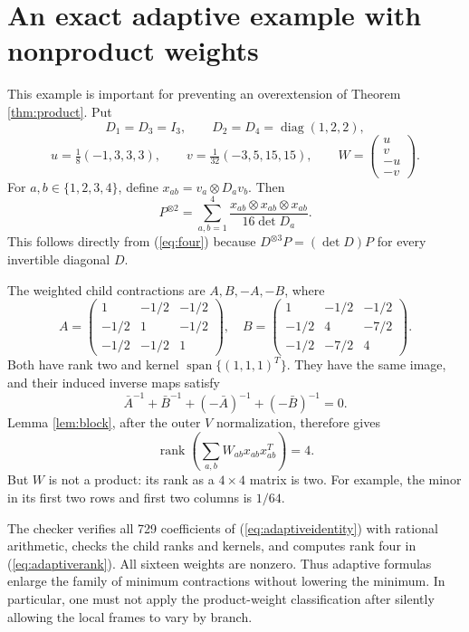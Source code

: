 \documentclass[11pt,letterpaper]{article}
\theoremstyle{definition}\newtheorem{definition}[theorem]{Definition}
\theoremstyle{remark}\newtheorem{remark}[theorem]{Remark}
\DeclareMathOperator{\rank}{rank}
\DeclareMathOperator{\diag}{diag}
\DeclareMathOperator{\spanop}{span}
\begin{document}
\section{An exact adaptive example with nonproduct weights}\label{sec:example}
This example is important for preventing an overextension of Theorem \ref{thm:product}. Put
\[
D_1=D_3=I_3,\qquad D_2=D_4=\diag(1,2,2),
\]
\[
u=\tfrac18(-1,3,3,3),\qquad v=\tfrac1{32}(-3,5,15,15),\qquad
W=\begin{pmatrix}u\\v\\-u\\-v\end{pmatrix}.
\]
For $a,b\in\{1,2,3,4\}$, define $x_{ab}=v_a\otimes D_av_b$. Then
\begin{equation}\label{eq:adaptiveidentity}
P^{\otimes2}=\sum_{a,b=1}^{4}\frac{x_{ab}\otimes x_{ab}\otimes x_{ab}}{16\det D_a}.
\end{equation}
This follows directly from (\ref{eq:four}) because $D^{\otimes3}P=(\det D)P$ for every invertible diagonal $D$.

The weighted child contractions are $A,B,-A,-B$, where
\[
A=\begin{pmatrix}1&-1/2&-1/2\\-1/2&1&-1/2\\-1/2&-1/2&1\end{pmatrix},\quad
B=\begin{pmatrix}1&-1/2&-1/2\\-1/2&4&-7/2\\-1/2&-7/2&4\end{pmatrix}.
\]
Both have rank two and kernel $\spanop\{(1,1,1)^T\}$. They have the same image, and their induced inverse maps satisfy
\[
\bar A^{-1}+\bar B^{-1}+(-\bar A)^{-1}+(-\bar B)^{-1}=0.
\]
Lemma \ref{lem:block}, after the outer $V$ normalization, therefore gives
\begin{equation}\label{eq:adaptiverank}
\rank\left(\sum_{a,b}W_{ab}x_{ab}x_{ab}^{T}\right)=4.
\end{equation}
But $W$ is not a product: its rank as a $4\times4$ matrix is two. For example, the minor in its first two rows and first two columns is $1/64$.

The checker verifies all 729 coefficients of (\ref{eq:adaptiveidentity}) with rational arithmetic, checks the child ranks and kernels, and computes rank four in (\ref{eq:adaptiverank}). All sixteen weights are nonzero. Thus adaptive formulas enlarge the family of minimum contractions without lowering the minimum. In particular, one must not apply the product-weight classification after silently allowing the local frames to vary by branch.
\end{document}
